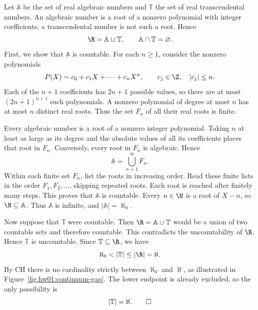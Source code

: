Let $\mathbb{A}$ be the set of real algebraic numbers and
$\mathbb{T}$ the set of real transcendental numbers. An algebraic
number is a root of a nonzero polynomial with integer coefficients;
a transcendental number is not such a root. Hence
\[
  \R=\mathbb{A}\cup\mathbb{T},
  \qquad\mathbb{A}\cap\mathbb{T}=\varnothing.
\]
First, we show that $\mathbb{A}$ is countable. For each $n\ge1$,
consider the nonzero polynomials
\[
  P(X)=c_0+c_1X+\cdots+c_nX^n,
  \qquad c_j\in\Z,\quad |c_j|\le n.
\]
Each of the $n+1$ coefficients has $2n+1$ possible values, so
there are at most $(2n+1)^{n+1}$ such polynomials.
A nonzero polynomial of degree at most $n$ has at most $n$
distinct real roots. Thus the set $F_n$ of all their real roots
is finite.

Every algebraic number is a root of a nonzero integer polynomial.
Taking $n$ at least as large as its degree and the absolute values
of all its coefficients places that root in $F_n$.
Conversely, every root in $F_n$ is algebraic. Hence
\[
  \mathbb{A}=\bigcup_{n=1}^{\infty}F_n.
\]
Within each finite set $F_n$, list the roots in increasing order.
Read these finite lists in the order $F_1,F_2,\ldots$, skipping
repeated roots. Each root is reached after finitely many steps.
This proves that $\mathbb{A}$ is countable. Every $n\in\N$
is a root of $X-n$, so $\N\subseteq\mathbb{A}$. Thus
$\mathbb{A}$ is infinite, and $|\mathbb{A}|=\aleph_0$.

\begin{marginfigure}
  \centering
  
  \caption{CH excludes intermediate cardinalities. Since
    $\mathbb{T}$ is uncountable and contained in $\R$, its cardinality
    must equal $\aleph$.}
  \label{fig:hw01:continuum-gap}
\end{marginfigure}

Now suppose that $\mathbb{T}$ were countable. Then
$\R=\mathbb{A}\cup\mathbb{T}$ would be a union of two countable
sets and therefore countable. This contradicts the uncountability
of $\R$. Hence $\mathbb{T}$ is uncountable. Since
$\mathbb{T}\subseteq\R$, we have
\[
  \aleph_0<|\mathbb{T}|\le|\R|=\aleph.
\]
By CH there is no cardinality strictly between $\aleph_0$ and
$\aleph$, as illustrated in Figure~\ref{fig:hw01:continuum-gap}.
The lower endpoint is already excluded, so the only possibility is
\[
  |\mathbb{T}|=\aleph.\qedhere
\]
